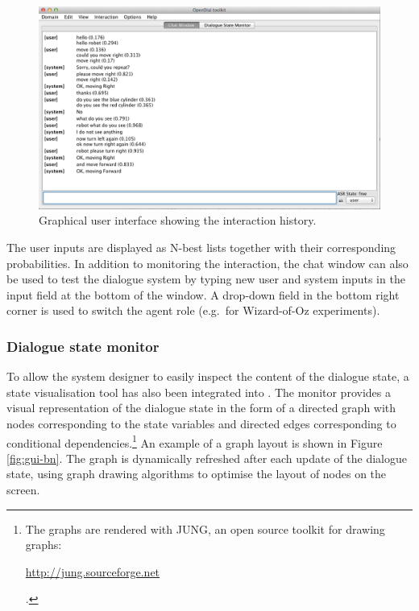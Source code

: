 \begin{figure}[ht]
\centering
\includegraphics[scale=0.40]{imgs/gui-chatbox.png}
\caption{Graphical user interface showing the interaction history.}
\label{fig:gui-chatbox}
\end{figure}

  The user inputs are displayed as N-best lists together with their corresponding probabilities. In addition to monitoring the interaction, the chat window can also be used to test the dialogue system by typing new user and system inputs in the input field at the bottom of the window.  A drop-down field in the bottom right corner is used to switch the agent role (e.g.\ for Wizard-of-Oz experiments). 


\subsubsection*{Dialogue state monitor}

To allow the system designer to easily inspect the content of the dialogue state, a state visualisation tool has also been integrated into \opendial{}.  The monitor provides a visual representation of the dialogue state in the form of a directed graph with nodes corresponding to the state variables and directed edges corresponding to conditional dependencies.\footnote{The graphs are rendered with JUNG, an open source toolkit for drawing graphs: \begin{scriptsize}\url{http://jung.sourceforge.net}\end{scriptsize}.} An example of a graph layout is shown in Figure \ref{fig:gui-bn}. The graph is dynamically refreshed after each update of the dialogue state, using graph drawing algorithms to optimise the layout of nodes on the screen. 

